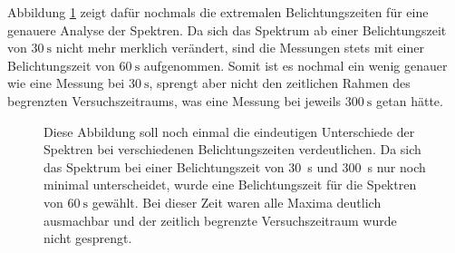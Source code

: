 Abbildung \ref{fig:BelichtungszeitExtremal} zeigt dafür nochmals die extremalen Belichtungszeiten für eine genauere Analyse der Spektren. Da sich das Spektrum ab einer Belichtungszeit von $\SI{30}{\second}$ nicht mehr merklich verändert, sind die Messungen stets mit einer Belichtungszeit von $\SI{60}{\second}$ aufgenommen. Somit ist es nochmal ein wenig genauer wie eine Messung bei $\SI{30}{\second}$, sprengt aber nicht den zeitlichen Rahmen des begrenzten Versuchszeitraums, was eine Messung bei jeweils $\SI{300}{\second}$ getan hätte.
\begin{figure}[H]
    \centering
       
    \caption[Eindeutige Unterschiede der Spektren bei verschiedenen Belichtungszeiten]{Diese Abbildung soll noch einmal die eindeutigen Unterschiede der Spektren bei verschiedenen Belichtungszeiten verdeutlichen. Da sich das Spektrum bei einer Belichtungszeit von \SI{30}{\second} und \SI{300}{\second} nur noch minimal unterscheidet, wurde eine Belichtungszeit für die Spektren von $\SI{60}{\second}$ gewählt. Bei dieser Zeit waren alle Maxima deutlich ausmachbar und der zeitlich begrenzte Versuchszeitraum wurde nicht gesprengt.}
    \label{fig:BelichtungszeitExtremal}
\end{figure}
